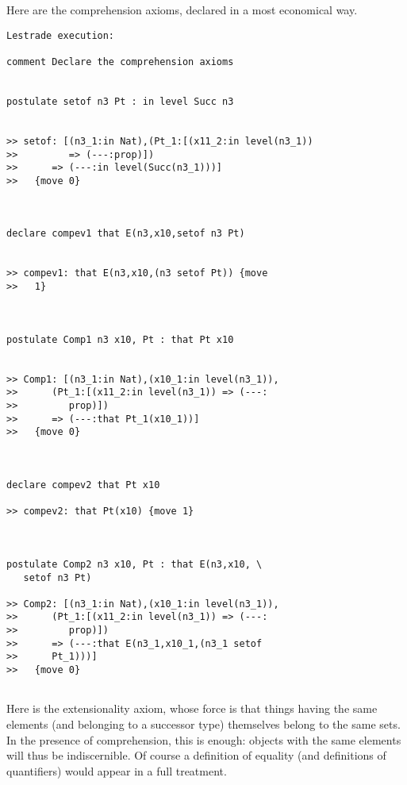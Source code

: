 \documentclass[12pt]{article}
\begin{document}
Here are the comprehension axioms, declared in a most economical way.

\begin{verbatim}Lestrade execution:

comment Declare the comprehension axioms


postulate setof n3 Pt : in level Succ n3


>> setof: [(n3_1:in Nat),(Pt_1:[(x11_2:in level(n3_1))
>>         => (---:prop)])
>>      => (---:in level(Succ(n3_1)))]
>>   {move 0}



declare compev1 that E(n3,x10,setof n3 Pt)


>> compev1: that E(n3,x10,(n3 setof Pt)) {move
>>   1}



postulate Comp1 n3 x10, Pt : that Pt x10


>> Comp1: [(n3_1:in Nat),(x10_1:in level(n3_1)),
>>      (Pt_1:[(x11_2:in level(n3_1)) => (---:
>>         prop)])
>>      => (---:that Pt_1(x10_1))]
>>   {move 0}



declare compev2 that Pt x10

>> compev2: that Pt(x10) {move 1}



postulate Comp2 n3 x10, Pt : that E(n3,x10, \
   setof n3 Pt)

>> Comp2: [(n3_1:in Nat),(x10_1:in level(n3_1)),
>>      (Pt_1:[(x11_2:in level(n3_1)) => (---:
>>         prop)])
>>      => (---:that E(n3_1,x10_1,(n3_1 setof
>>      Pt_1)))]
>>   {move 0}


\end{verbatim}

Here is the extensionality axiom, whose force is that things having the same elements (and belonging to a successor type) themselves belong to the same sets.
In the presence of comprehension, this is enough:  objects with the same elements will thus be indiscernible.  Of course a definition of equality (and definitions of quantifiers)
would appear in a full treatment.
\end{document}
